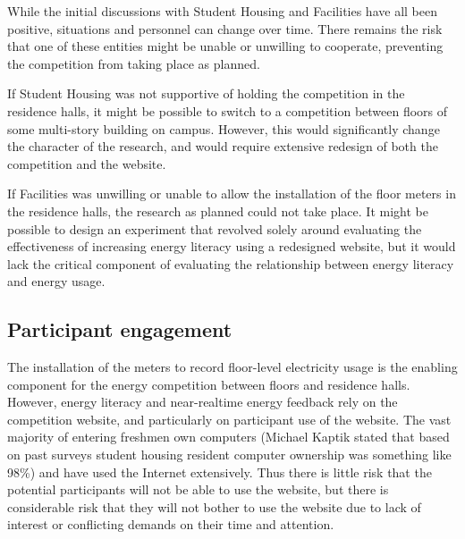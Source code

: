 While the initial discussions with Student Housing and Facilities have all been positive, situations and personnel can change over time. There remains the risk that one of these entities might be unable or unwilling to cooperate, preventing the competition from taking place as planned.

If Student Housing was not supportive of holding the competition in the residence halls, it might be possible to switch to a competition between floors of some multi-story building on campus. However, this would significantly change the character of the research, and would require extensive redesign of both the competition and the website.

If Facilities was unwilling or unable to allow the installation of the floor meters in the residence halls, the research as planned could not take place. It might be possible to design an experiment that revolved solely around evaluating the effectiveness of increasing energy literacy using a redesigned website, but it would lack the critical component of evaluating the relationship between energy literacy and energy usage.

\subsection{Participant engagement}
\label{sec:participant-engagement}

The installation of the meters to record floor-level electricity usage is the enabling component for the energy competition between floors and residence halls. However, energy literacy and near-realtime energy feedback rely on the competition website, and particularly on participant use of the website. The vast majority of entering freshmen own computers (Michael Kaptik stated that based on past surveys student housing resident computer ownership was something like 98\%) and have used the Internet extensively. Thus there is little risk that the potential participants will not be able to use the website, but there is considerable risk that they will not bother to use the website due to lack of interest or conflicting demands on their time and attention.

